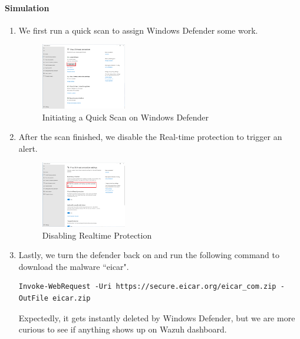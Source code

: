 \paragraph{Simulation}
\begin{enumerate}
    \item We first run a quick scan to assign Windows Defender some work.
    \begin{figure}[H]
        \centering
        \includegraphics[width=0.35\textwidth]{images/malware-detection/windows-log/2.png}
        \caption{Initiating a Quick Scan on Windows Defender}
        \label{fig:win-quick-scan}
    \end{figure}
    \item After the scan finished, we disable the Real-time protection to trigger an alert.
    \begin{figure}[H]
        \centering
        \includegraphics[width=0.35\textwidth]{images/malware-detection/windows-log/3.png}
        \caption{Disabling Realtime Protection}
        \label{fig:win-disable-defender}
    \end{figure}
    \item Lastly, we turn the defender back on and run the following command to download the malware ``eicar".
    \begin{verbatim}
Invoke-WebRequest -Uri https://secure.eicar.org/eicar_com.zip -OutFile eicar.zip
    \end{verbatim}
    Expectedly, it gets instantly deleted by Windows Defender, but we are more curious to see if anything shows up on Wazuh dashboard.
\end{enumerate}

